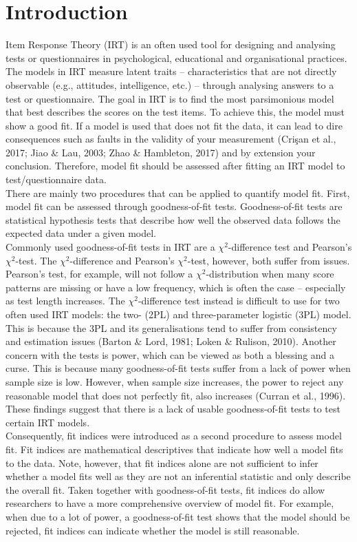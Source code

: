 \documentclass[Royal,sageapa,times,doublespace]{Manuscript-Files/sagej}
\begin{document}
\section{Introduction}
Item Response Theory (IRT) is an often used tool for designing and analysing tests or questionnaires in psychological, educational and organisational practices. The models in IRT measure latent traits -- characteristics that are not directly observable (e.g., attitudes, intelligence, etc.) -- through analysing answers to a test or questionnaire. The goal in IRT is to find the most parsimonious model that best describes the scores on the test items. To achieve this, the model must show a good fit. If a model is used that does not fit the data, it can lead to dire consequences such as faults in the validity of your measurement (Cri\c{s}an et al., 2017; Jiao \& Lau, 2003; Zhao \& Hambleton, 2017) and by extension your conclusion. Therefore, model fit should be assessed after fitting an IRT model to test/questionnaire data. \\
\indent There are mainly two procedures that can be applied to quantify model fit. First, model fit can be assessed through goodness-of-fit tests. Goodness-of-fit tests are statistical hypothesis tests that describe how well the observed data follows the expected data under a given model. \\
\indent Commonly used goodness-of-fit tests in IRT are a $\chi^2$-difference test and Pearson's $\chi^2$-test. The $\chi^2$-difference and Pearson's $\chi^2$-test, however, both suffer from issues. Pearson's test, for example, will not follow a $\chi^2$-distribution when many score patterns are missing or have a low frequency, which is often the case -- especially as test length increases. The $\chi^2$-difference test instead is difficult to use for two often used IRT models: the two- (2PL) and three-parameter logistic (3PL) model. This is because the 3PL and its generalisations tend to suffer from consistency and estimation issues (Barton \& Lord, 1981; Loken \& Rulison, 2010). Another concern with the tests is power, which can be viewed as both a blessing and a curse. This is because many goodness-of-fit tests suffer from a lack of power when sample size is low. However, when sample size increases, the power to reject any reasonable model that does not perfectly fit, also increases (Curran et al., 1996). These findings suggest that there is a lack of usable goodness-of-fit tests to test certain IRT models. \\
\indent Consequently, fit indices were introduced as a second procedure to assess model fit. Fit indices are mathematical descriptives that indicate how well a model fits to the data. Note, however, that fit indices alone are not sufficient to infer whether a model fits well as they are not an inferential statistic and only describe the overall fit. Taken together with goodness-of-fit tests, fit indices do allow researchers to have a more comprehensive overview of model fit. For example, when due to a lot of power, a goodness-of-fit test shows that the model should be rejected, fit indices can indicate whether the model is still reasonable. \\ 
\end{document}
